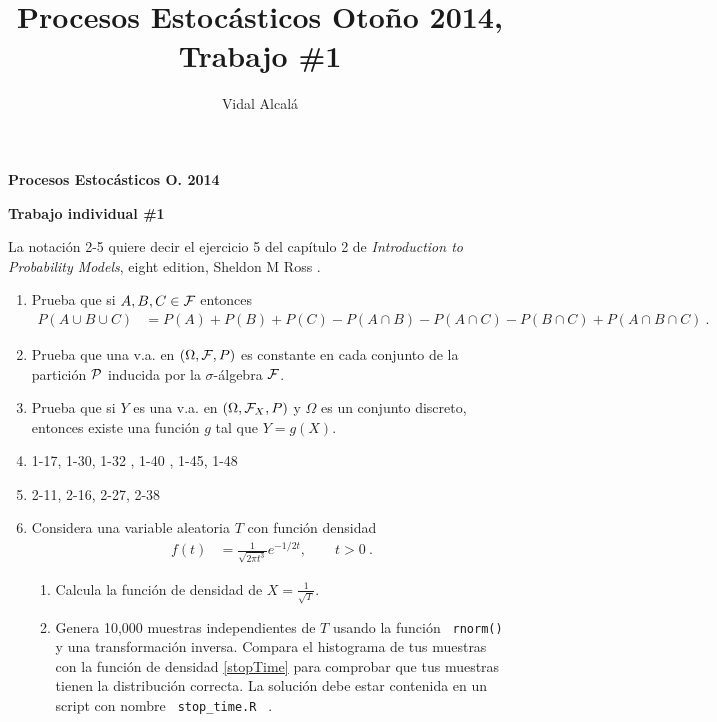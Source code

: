 \documentclass{article}
\title{Procesos Estocásticos Otoño 2014, Trabajo \#1}
\author{Vidal Alcalá}
\begin{document}
\begin{center}
{\bf Procesos Estocásticos O. 2014 }

{\bf Trabajo individual \#1}
\end{center}

\bigskip

La notación 2-5 quiere decir el ejercicio 5 del capítulo 2 de \emph{Introduction to Probability Models}, eight edition, Sheldon M Ross .

\begin{enumerate}
\item Prueba que si $A,B,C\in \mathcal{F}$ entonces
\begin{equation*}
	\begin{split}
	P(A \cup B \cup C ) &= P(A) + P(B) + P(C)-P(A\cap B)-P(A\cap C)- P(B\cap C) + P(A\cap B\cap C) \:.
	\end{split}
\end{equation*}

\item Prueba que una v.a. en $(\Omega, \mathcal{F} ,P)$ es constante en cada conjunto de la partición $\mathcal{P}$ inducida por la $\sigma$-álgebra $\mathcal{F}$.

\item Prueba que si $Y$ es una v.a. en $(\Omega,\mathcal{F}_X, P)$ y $\Omega$ es un conjunto discreto, entonces existe una función $g$ tal que $Y=g(X)$.

\item 1-17, 1-30, 1-32 , 1-40 , 1-45, 1-48

\item 2-11, 2-16, 2-27, 2-38 

\item Considera una variable aleatoria $T$ con función densidad
\begin{equation}\label{stopTime}
  \begin{split}
  f(t) &= \frac{1}{\sqrt{2\pi t^3}} e^{-1/2t},\qquad t>0\:.
  \end{split}
\end{equation}
\begin{enumerate}
\item Calcula la función de densidad de $X=\frac{1}{\sqrt{T}}$.
\item Genera 10,000 muestras independientes de $T$ usando la función \verb+ rnorm()+ y una transformación inversa. Compara el histograma de tus muestras con la función de densidad \eqref{stopTime} para comprobar que tus muestras tienen la distribución correcta. La solución debe estar contenida en un script con nombre \verb+ stop_time.R + .
\end{enumerate}


\end{enumerate}
\end{document}
